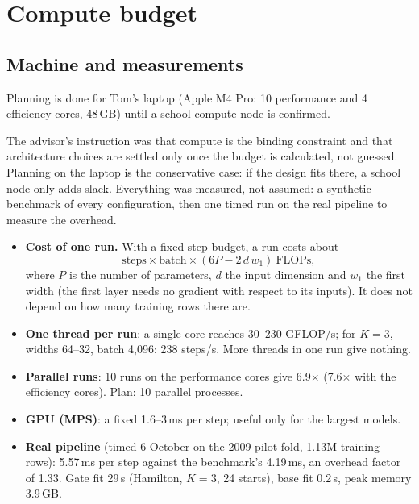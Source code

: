 \section{Compute budget}
\label{sec:compute}

\subsection{Machine and measurements}

Planning is done for Tom's laptop (Apple M4 Pro: 10 performance and 4 efficiency cores, 48\,GB) until a
school compute node is confirmed. 

\begin{whybox}
The advisor's instruction was that compute is the binding constraint and that architecture choices are
settled only once the budget is calculated, not guessed. Planning on the laptop is the conservative case: if
the design fits there, a school node only adds slack. Everything was measured, not assumed: a synthetic
benchmark of every configuration, then one timed run on the real pipeline to measure the overhead.
\end{whybox}

\begin{itemize}
\item \textbf{Cost of one run.} With a fixed step budget, a run costs about
  \[\text{steps}\times\text{batch}\times(6P-2\,d\,w_1)\ \text{FLOPs},\]
  where $P$ is the number of parameters, $d$ the input dimension and $w_1$ the first width (the first
  layer needs no gradient with respect to its inputs). It does not depend on how many training rows
  there are.
\item \textbf{One thread per run}: a single core reaches 30--230 GFLOP/s; for $K=3$, widths 64--32, batch
  4,096: 238 steps/s. More threads in one run give nothing.
\item \textbf{Parallel runs}: 10 runs on the performance cores give 6.9$\times$ (7.6$\times$ with the
  efficiency cores). Plan: 10 parallel processes.
\item \textbf{GPU (MPS)}: a fixed 1.6--3\,ms per step; useful only for the largest models.
\item \textbf{Real pipeline} (timed 6 October on the 2009 pilot fold, 1.13M training rows): 5.57\,ms per
  step against the benchmark's 4.19\,ms, an overhead factor of 1.33. Gate fit 29\,s (Hamilton, $K=3$,
  24 starts), base fit 0.2\,s, peak memory 3.9\,GB.
\end{itemize}

